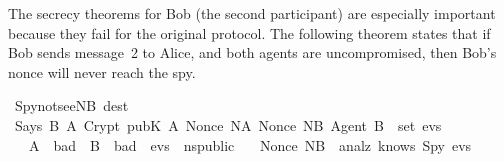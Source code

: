 \begin{isabellebody}
\isadelimproof
%
\endisadelimproof
%
\isatagproof
%
\endisatagproof
{\isafoldproof}%
%
\isadelimproof
%
\endisadelimproof
%
\isamarkuptrue%
%
\isadelimproof
%
\endisadelimproof
%
\isatagproof
%
\endisatagproof
{\isafoldproof}%
%
\isadelimproof
%
\endisadelimproof
%
\isadelimproof
%
\endisadelimproof
%
\isatagproof
%
\endisatagproof
{\isafoldproof}%
%
\isadelimproof
%
\endisadelimproof
%
\isadelimproof
%
\endisadelimproof
%
\isatagproof
%
\endisatagproof
{\isafoldproof}%
%
\isadelimproof
%
\endisadelimproof
%
\isadelimproof
%
\endisadelimproof
%
\isatagproof
%
\endisatagproof
{\isafoldproof}%
%
\isadelimproof
%
\endisadelimproof
%
\isadelimproof
%
\endisadelimproof
%
\isatagproof
%
\endisatagproof
{\isafoldproof}%
%
\isadelimproof
%
\endisadelimproof
%
\begin{isamarkuptext}%
The secrecy theorems for Bob (the second participant) are especially
important because they fail for the original protocol.  The following
theorem states that if Bob sends message~2 to Alice, and both agents are
uncompromised, then Bob's nonce will never reach the spy.%
\end{isamarkuptext}%
\isamarkuptrue%
\isamarkupfalse%
\ Spy{}not{}see{}NB\ {}dest{}{}\isanewline
\ {}{}Says\ B\ A\ {}Crypt\ {}pubK\ A{}\ {}Nonce\ NA{}\ Nonce\ NB{}\ Agent\ B{}{}\ {}\ set\ evs{}\isanewline
\ \ \ A\ {}\ bad{}\ \ B\ {}\ bad{}\ \ evs\ {}\ ns{}public{}\isanewline
\ \ {}\ Nonce\ NB\ {}\ analz\ {}knows\ Spy\ evs{}{}%

\end{isabellebody}
